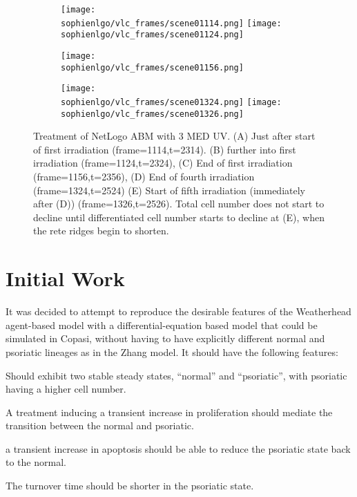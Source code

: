 \documentclass[a4paper,10pt]{report}
\newcommand{\psortbase}{/home/ngrs2/work/bsu/PSORT_Zuliani_Reynolds/}
\newcommand{\sophienlgo}{\psortbase/netlogo_model}
\begin{document}
\begin{figure}[h!]
  \begin{subfigure}{\textwidth}
    \subcaptionbox{}
    {\texttt{[image: \\sophienlgo/vlc\_frames/scene01114.png]}}
    \subcaptionbox{}
    {\texttt{[image: \\sophienlgo/vlc\_frames/scene01124.png]}}  \end{subfigure}
  \begin{subfigure}{\textwidth}
    \centering
    \subcaptionbox{}
    {\texttt{[image: \\sophienlgo/vlc\_frames/scene01156.png]}}
  \end{subfigure}
  \begin{subfigure}{\textwidth}
    \subcaptionbox{}
    {\texttt{[image: \\sophienlgo/vlc\_frames/scene01324.png]}}
    \subcaptionbox{}
    {\texttt{[image: \\sophienlgo/vlc\_frames/scene01326.png]}}
  \end{subfigure}
  \caption{Treatment of NetLogo ABM with 3 MED UV. (A) Just after start of first irradiation (frame=1114,t=2314). (B) further into first irradiation (frame=1124,t=2324),
(C) End of first irradiation (frame=1156,t=2356),
(D) End of fourth irradiation (frame=1324,t=2524)
(E) Start of fifth irradiation (immediately after (D))  (frame=1326,t=2526). 
Total cell number does not start to decline until differentiated cell number starts to decline at (E), when the rete ridges begin to shorten.}
  \label{fig:sophie_abm_snapshots}
\end{figure}




\section{Initial Work}\label{sec:SWinitial}

It was decided to attempt to reproduce the desirable features of the Weatherhead agent-based model with a differential-equation based model that could be simulated in Copasi, without having to have explicitly different normal and psoriatic lineages as in the Zhang model. It should have the following features:

\begin{description}
\item Should exhibit two stable steady states, ``normal'' and ``psoriatic'', with psoriatic having a higher cell number.
\item A treatment inducing a transient increase in proliferation should mediate the transition between the normal and psoriatic. 
\item a transient increase in apoptosis should be able to reduce the psoriatic state back to the normal. 
\item The turnover time should be shorter in the psoriatic state.
\end {description}
\end{document}
